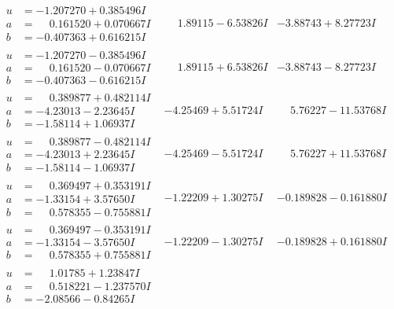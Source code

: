 \documentclass[1p]{elsarticle_modified}
\theoremstyle{definition}
\begin{document}
$$\begin{array}{c|c|c}
\begin{aligned}
u &= -1.207270 + 0.385496 I \\
a &= \phantom{-}0.161520 + 0.070667 I \\
b &= -0.407363 + 0.616215 I\end{aligned}
 & \phantom{-}1.89115 - 6.53826 I & -3.88743 + 8.27723 I \\ \hline\begin{aligned}
u &= -1.207270 - 0.385496 I \\
a &= \phantom{-}0.161520 - 0.070667 I \\
b &= -0.407363 - 0.616215 I\end{aligned}
 & \phantom{-}1.89115 + 6.53826 I & -3.88743 - 8.27723 I \\ \hline\begin{aligned}
u &= \phantom{-}0.389877 + 0.482114 I \\
a &= -4.23013 - 2.23645 I \\
b &= -1.58114 + 1.06937 I\end{aligned}
 & -4.25469 + 5.51724 I & \phantom{-}5.76227 - 11.53768 I \\ \hline\begin{aligned}
u &= \phantom{-}0.389877 - 0.482114 I \\
a &= -4.23013 + 2.23645 I \\
b &= -1.58114 - 1.06937 I\end{aligned}
 & -4.25469 - 5.51724 I & \phantom{-}5.76227 + 11.53768 I \\ \hline\begin{aligned}
u &= \phantom{-}0.369497 + 0.353191 I \\
a &= -1.33154 + 3.57650 I \\
b &= \phantom{-}0.578355 - 0.755881 I\end{aligned}
 & -1.22209 + 1.30275 I & -0.189828 - 0.161880 I \\ \hline\begin{aligned}
u &= \phantom{-}0.369497 - 0.353191 I \\
a &= -1.33154 - 3.57650 I \\
b &= \phantom{-}0.578355 + 0.755881 I\end{aligned}
 & -1.22209 - 1.30275 I & -0.189828 + 0.161880 I \\ \hline\begin{aligned}
u &= \phantom{-}1.01785 + 1.23847 I \\
a &= \phantom{-}0.518221 - 1.237570 I \\
b &= -2.08566 - 0.84265 I\end{aligned}

\end{array}$$
\end{document}
